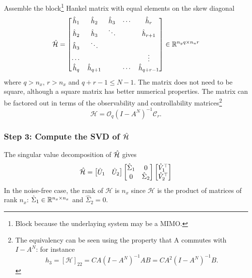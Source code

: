 Assemble the block\footnote{Block because the underlaying system may be a MIMO.} Hankel matrix with equal elements on the skew diagonal
\begin{equation*}
  \hat{\mathcal{H}} =
  \begin{bmatrix}
    \hat{h}_1 & \hat{h}_2 & \hat{h}_3 & \cdots & \hat{h}_r \\
    \hat{h}_2 & \hat{h}_3 & \ddots & & \hat{h}_{r+1} \\
    \hat{h}_3 & \ddots & & & \\
    \cdots & & & & \vdots \\
    \hat{h}_q & \hat{h}_{q+1} & & \cdots & \hat{h}_{q+r-1}
  \end{bmatrix} \in \mathbb{R}^{n_yq \times n_ur}
\end{equation*}
where $q>n_x$, $r>n_x$ and $q+r-1\leq N-1$. The matrix does not need to be square, although a square matrix has better numerical properties. The matrix can be factored out in terms of the observability and controllability matrices\footnote{The equivalency can be seen using the property that A commutes with $I-A^N$: for instance
  \begin{equation*}
    h_3 = [\mathcal{H}]_{22} = CA \left(I-A^N\right)^{-1}AB = CA^2 \left(I-A^N\right)^{-1}B.
  \end{equation*}}
\begin{equation*}
  \mathcal{H} = \mathcal{O}_q \left(I - A^N\right)^{-1} \mathcal{C}_r.
\end{equation*}

\subsubsection{Step 3: Compute the SVD of $\hat{\mathcal{H}}$}

The singular value decomposition of $\hat{\mathcal{H}}$ gives
\begin{equation*}
  \hat{\mathcal{H}} =
  \begin{bmatrix}
    \hat{U}_1 & \hat{U}_2
  \end{bmatrix}
  \begin{bmatrix}
    \hat{\Sigma}_1 & 0 \\ 0 & \hat{\Sigma}_2
  \end{bmatrix}
  \begin{bmatrix}
    \hat{V}_1^\top \\ \hat{V}_2^\top
  \end{bmatrix}
\end{equation*}
In the noise-free case, the rank of $\mathcal{H}$ is $n_x$ since $\mathcal{H}$ is the product of matrices of rank $n_x$: $\hat{\Sigma}_1\in \mathbb{R}^{n_x\times n_x}$ and $\hat{\Sigma}_2=0$.

